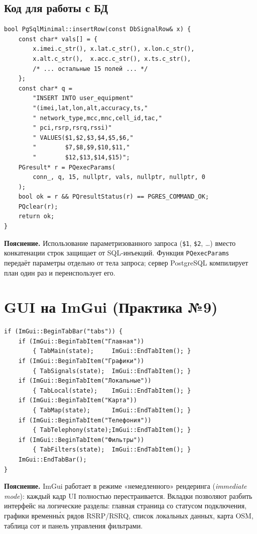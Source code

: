 \documentclass[a4paper,14pt,oneside,openany]{memoir}
\begin{document}
\subsection{Код для работы с БД}

\begin{lstlisting}[language=CppSeventeen,
    caption={src/db/pgsql\_minimal.cpp --- вставка строки}]
bool PgSqlMinimal::insertRow(const DbSignalRow& x) {
    const char* vals[] = {
        x.imei.c_str(), x.lat.c_str(), x.lon.c_str(),
        x.alt.c_str(),  x.acc.c_str(), x.ts.c_str(),
        /* ... остальные 15 полей ... */
    };
    const char* q =
        "INSERT INTO user_equipment"
        "(imei,lat,lon,alt,accuracy,ts,"
        " network_type,mcc,mnc,cell_id,tac,"
        " pci,rsrp,rsrq,rssi)"
        " VALUES($1,$2,$3,$4,$5,$6,"
        "        $7,$8,$9,$10,$11,"
        "        $12,$13,$14,$15)";
    PGresult* r = PQexecParams(
        conn_, q, 15, nullptr, vals, nullptr, nullptr, 0
    );
    bool ok = r && PQresultStatus(r) == PGRES_COMMAND_OK;
    PQclear(r);
    return ok;
}
\end{lstlisting}

\textbf{Пояснение.} Использование параметризованного запроса
(\texttt{\$1}, \texttt{\$2}, …) вместо конкатенации строк защищает от
SQL-инъекций. Функция \texttt{PQexecParams} передаёт параметры отдельно
от тела запроса; сервер PostgreSQL компилирует план один раз и
переиспользует его.

\section{GUI на ImGui (Практика №9)}

\begin{lstlisting}[language=CppSeventeen,
    caption={src/gui\_app.cpp --- отрисовка вкладок}]
if (ImGui::BeginTabBar("tabs")) {
    if (ImGui::BeginTabItem("Главная"))
        { TabMain(state);     ImGui::EndTabItem(); }
    if (ImGui::BeginTabItem("Графики"))
        { TabSignals(state);  ImGui::EndTabItem(); }
    if (ImGui::BeginTabItem("Локальные"))
        { TabLocal(state);    ImGui::EndTabItem(); }
    if (ImGui::BeginTabItem("Карта"))
        { TabMap(state);      ImGui::EndTabItem(); }
    if (ImGui::BeginTabItem("Телефония"))
        { TabTelephony(state);ImGui::EndTabItem(); }
    if (ImGui::BeginTabItem("Фильтры"))
        { TabFilters(state);  ImGui::EndTabItem(); }
    ImGui::EndTabBar();
}
\end{lstlisting}

\textbf{Пояснение.} ImGui работает в режиме «немедленного» рендеринга
(\textit{immediate mode}): каждый кадр UI полностью перестраивается.
Вкладки позволяют разбить интерфейс на логические разделы: главная
страница со статусом подключения, графики временны́х рядов RSRP/RSRQ,
список локальных данных, карта OSM, таблица сот и панель управления
фильтрами.
\end{document}
